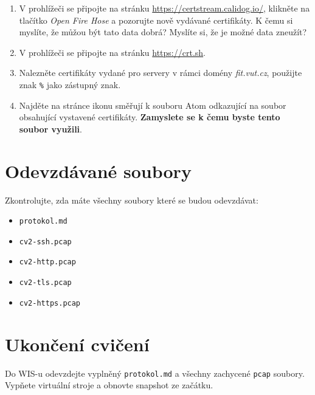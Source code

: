 \documentclass[a4paper,11pt]{article}
\begin{document}
\begin{enumerate}
\begin{enumerate}
      \item V prohlížeči se připojte na stránku \url{https://certstream.calidog.io/}, klikněte na tlačítko \emph{Open Fire Hose} a pozorujte nově vydávané certifikáty.
        K čemu si myslíte, že
        můžou být tato data dobrá?
        Myslíte si, že je možné data zneužít?

      \item V prohlížeči se připojte na stránku \url{https://crt.sh}.

      \item Nalezněte certifikáty vydané pro servery v rámci domény \emph{fit.vut.cz}, použijte znak \verb|%| jako zástupný znak.

      \item Najděte na stránce ikonu směřují k souboru Atom odkazující na soubor obsahující vystavené certifikáty.
        {\bf Zamyslete se k čemu byste tento soubor využili}.

    \end{enumerate}

\end{enumerate}

\section*{Odevzdávané soubory}
Zkontrolujte, zda máte všechny soubory které se budou odevzdávat:
\begin{itemize}
  \item \texttt{protokol.md}
  \item \texttt{cv2-ssh.pcap}
  \item \texttt{cv2-http.pcap}
  \item \texttt{cv2-tls.pcap}
  \item \texttt{cv2-https.pcap}
\end{itemize}

\section{Ukončení cvičení}
Do WIS-u odevzdejte vyplněný \texttt{protokol.md} a všechny zachycené \texttt{pcap} soubory.
Vypňete virtuální stroje a obnovte snapshot ze začátku.
\end{document}
